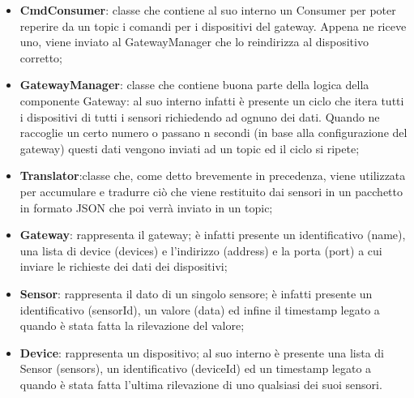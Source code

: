 \begin{landscape}
\begin{itemize}
		\item \textbf{CmdConsumer}: classe che contiene al suo interno un Consumer per poter reperire da un topic  i comandi per i dispositivi del gateway. Appena ne riceve uno, viene inviato al GatewayManager che lo reindirizza al dispositivo corretto;
		\item \textbf{GatewayManager}: classe che contiene buona parte della logica della componente Gateway: al suo interno infatti è presente un ciclo che itera tutti i dispositivi di tutti i sensori richiedendo ad ognuno dei dati. Quando ne raccoglie un certo numero o passano n secondi (in base alla configurazione del gateway) questi dati vengono inviati ad un topic ed il ciclo si ripete;
		\item \textbf{Translator}:classe che, come detto brevemente in precedenza, viene utilizzata per accumulare e tradurre ciò che viene restituito dai sensori in un pacchetto in formato JSON che poi verrà inviato in un topic;
		\item \textbf{Gateway}: rappresenta il gateway; è infatti presente un identificativo (name), una lista di device (devices) e l'indirizzo (address) e la porta (port) a cui inviare le richieste dei dati dei dispositivi;
		\item \textbf{Sensor}: rappresenta il dato di un singolo sensore; è infatti presente un identificativo (sensorId), un valore (data) ed infine il timestamp legato a quando è stata fatta la rilevazione del valore;
		\item \textbf{Device}: rappresenta un dispositivo; al suo interno è presente una lista di Sensor (sensors), un identificativo (deviceId) ed un timestamp legato a quando è stata fatta l'ultima rilevazione di uno qualsiasi dei suoi sensori.
	\end{itemize}
	\end{landscape}
		
